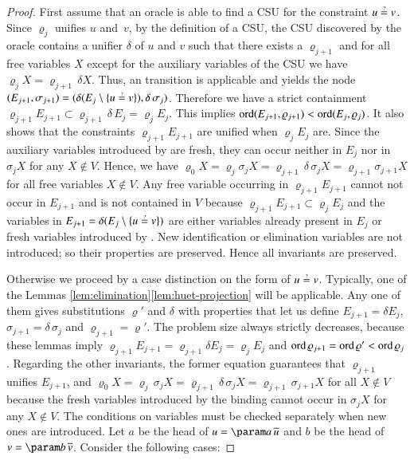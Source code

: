 \begin{proof}
    First assume that an oracle is able to find a CSU for the constraint $u\unif v$.
    Since $\varrho_{j}$ unifies $u$ and~$v$, by the definition of a CSU,
    the CSU discovered by the oracle 
    contains a
    unifier $\delta$ of $u$ and $v$ such that there exists a $\varrho_{j+1}$
    and for all free variables $X$ except for the auxiliary variables of the CSU
    we have $\varrho_{j} X=\varrho_{j+1}\,\delta X$. Thus, an 
    transition is applicable and yields the node 
    $(E_{j+1},\sigma_{j+1})=(\delta(E_{j}\setminus\{ u\unif v\} ),\delta\,\sigma_{j})$.
    Therefore we have a strict containment $\varrho_{j+1}E_{j+1}\subset\varrho_{j+1}\,\delta\,E_{j}=\varrho_{j}E_{j}$.
    This implies $\operatorname{ord}(E_{j+1},\varrho_{j+1})<\operatorname{ord}(E_{j},\varrho_{j})$.
    It also shows that the constraints $\varrho_{j+1}E_{j+1}$ are unified
    when $\varrho_{j}E_{j}$ are. 
    Since the auxiliary variables introduced by  are fresh,
    they can occur neither in $E_j$ nor in $\sigma_{j} X$ for any $X\not\in V$. Hence,
    we have $\varrho_{0} X = \varrho_{j}\sigma_{j} X = \varrho_{j+1}\,\delta\,\sigma_{j} X =\varrho_{j+1}\sigma_{j+1} X$
    for all free variables $X\not\in V$.
    Any free variable occurring in $\varrho_{j+1}E_{j+1}$ cannot not occur in $E_{j+1}$ and is not contained in $V$
    because  $\varrho_{j+1}E_{j+1}\subset\varrho_{j}E_{j}$
    and the variables in $E_{j+1} = \delta(E_{j}\setminus\{ u\unif v\} )$
    are either variables already present in $E_{j}$ or fresh variables introduced by .
    New identification or elimination variables are not introduced;
    so their properties are preserved. Hence all invariants are preserved.

    Otherwise we proceed by a case distinction on the form of $u\unif v$.
    Typically, one of the Lemmas \ref{lem:elimination}\textendash{}\ref{lem:huet-projection}
    will be applicable. Any one of them gives substitutions $\varrho'$
    and $\delta$ with properties that let us define $E_{j+1}=\delta E_{j}$,
    $\sigma_{j+1}=\delta\,\sigma_{j}$ and $\varrho_{j+1}=\varrho'$.
    The problem size always strictly decreases, because 
    these lemmas imply
    $\varrho_{j+1}E_{j+1}=\varrho_{j+1}\delta E_{j}=\varrho_{j}E_{j}$
    and $\operatorname{ord}\varrho_{j+1}=\operatorname{ord}\varrho'<\operatorname{ord}\varrho_{j}$.
    Regarding the other invariants, the former equation guarantees that $\varrho_{j+1}$
    unifies $E_{j+1}$, and 
    $\varrho_{0} X = \varrho_{j}\,\sigma_{j} X = \varrho_{j+1}\,\delta\,\sigma_{j} X =\varrho_{j+1}\,\sigma_{j+1} X$
    for all $X \not\in V$ because the fresh variables introduced by the binding cannot occur in $\sigma_{j} X$ for any $X\not\in V$. The conditions on variables must be checked
    separately when new ones are introduced. Let $a$ be
    the head of $u=\param a\,\seq u$ and $b$ be the head of $v = \param b\,\seq v$.
    Consider the following cases:


\end{proof}
